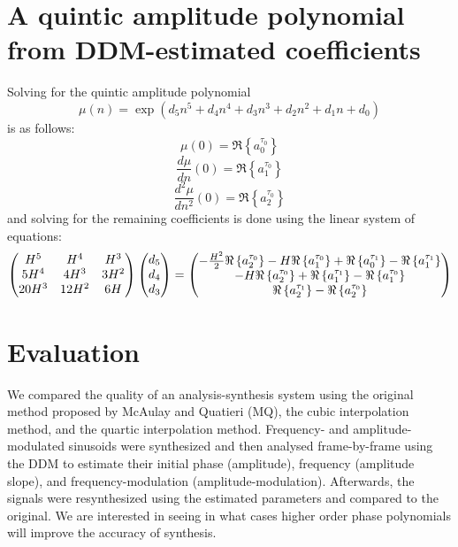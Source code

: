 \section{A quintic amplitude polynomial from DDM-estimated
coefficients\label{sec:quinticamppoly}}

Solving for the quintic amplitude polynomial
\begin{equation}
    \label{eq:quinticamppoly}
    \mu(n) = \exp \left(d_5 n^{5} + d_4 n^{4} + d_3 n^{3} + d_2 n^{2} + d_1 n + d_0 \right)
\end{equation}
is as follows:
\[
    \mu(0) = \Re \left\{ a^{\tau_0}_0 \right\}
\]
\[
    \frac{d \mu}{d n}(0) = \Re \left\{ a^{\tau_0}_1 \right\}
\]
\[
    \frac{d^{2} \mu}{d n^{2}}(0) = \Re \left\{ a^{\tau_0}_2 \right\}
\]
and solving for the remaining coefficients is done using the linear system of
equations:
\begin{equation}
    \begin{pmatrix}
        H^5 & H^4 & H^3 \\
        5 H^4 & 4 H^3 & 3 H^2 \\
        20 H^3 & 12 H^2 & 6 H
    \end{pmatrix}
    \begin{pmatrix}
        d_5 \\
        d_4 \\
        d_3
    \end{pmatrix}
    =
    \begin{pmatrix}
        -\frac{ H^{2} }{2} \Re \left\{  a^{\tau_0}_2  \right\} - H \Re \left\{  a^{\tau_0}_1  \right\} +
            \Re \left\{  a^{\tau_1}_0  \right\} - \Re \left\{  a^{\tau_1}_1  \right\} \\
        -H \Re \left\{  a^{\tau_0}_2  \right\} + \Re \left\{  a^{\tau_1}_1  \right\} - \Re \left\{  a^{\tau_0}_1  \right\} \\
        \Re \left\{  a^{\tau_1}_2  \right\} - \Re \left\{  a^{\tau_0}_2  \right\}
    \end{pmatrix}
\end{equation}

\section{Evaluation}

We compared the quality of an analysis-synthesis system using the
original method proposed by McAulay and Quatieri (MQ), the cubic interpolation
method, and the quartic interpolation method. Frequency- and
amplitude-modulated sinusoids were synthesized and then analysed frame-by-frame
using the DDM to estimate their initial phase (amplitude), frequency (amplitude
slope), and frequency-modulation (amplitude-modulation). Afterwards, the signals
were resynthesized using the estimated parameters and compared to the original.
We are interested in seeing in what cases higher order phase polynomials will
improve the accuracy of synthesis.

